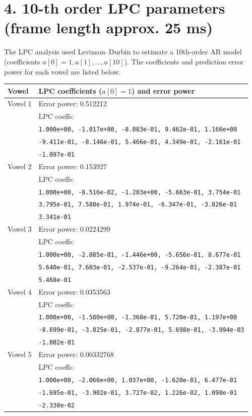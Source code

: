 \documentclass[11pt,a4paper]{article}
\begin{document}
\section*{4. 10-th order LPC parameters (frame length approx. 25 ms)}
The LPC analysis used Levinson--Durbin to estimate a 10th-order AR model (coefficients $a[0]=1, a[1],...,a[10]$). The coefficients and prediction error power for each vowel are listed below.
\usepackage{array}
\begin{longtable}{@{} l >{\raggedright\arraybackslash}p{10cm} @{} }
\textbf{Vowel} & \textbf{LPC coefficients ($a[0]=1$) and error power}\\ \hline
Vowel 1 & Error power: 0.512212\\& LPC coeffs:\\& \verb|1.000e+00, -1.017e+00, -8.083e-01, 9.462e-01, 1.166e+00| \\
& \verb|-9.411e-01, -8.146e-01, 5.466e-01, 4.349e-01, -2.161e-01| \\
& \verb|-1.097e-01|\\[4pt]
Vowel 2 & Error power: 0.153927\\& LPC coeffs:\\& \verb|1.000e+00, -8.516e-02, -1.203e+00, -5.663e-01, 3.754e-01| \\
& \verb|3.795e-01, 7.580e-01, 1.974e-01, -6.347e-01, -3.826e-01| \\
& \verb|3.341e-01|\\[4pt]
Vowel 3 & Error power: 0.0224299\\& LPC coeffs:\\& \verb|1.000e+00, -2.085e-01, -1.446e+00, -5.656e-01, 8.677e-01| \\
& \verb|5.640e-01, 7.603e-01, -2.537e-01, -9.264e-01, -2.387e-01| \\
& \verb|5.468e-01|\\[4pt]
Vowel 4 & Error power: 0.0353563\\& LPC coeffs:\\& \verb|1.000e+00, -1.580e+00, -1.368e-01, 5.720e-01, 1.197e+00| \\
& \verb|-8.699e-01, -3.025e-01, -2.877e-01, 5.698e-01, -3.994e-03| \\
& \verb|-1.002e-01|\\[4pt]
Vowel 5 & Error power: 0.00332768\\& LPC coeffs:\\& \verb|1.000e+00, -2.066e+00, 1.037e+00, -1.620e-01, 6.477e-01| \\
& \verb|-1.695e-01, -3.902e-01, 3.727e-02, 1.226e-02, 1.098e-01| \\
& \verb|-2.330e-02|\\[4pt]
\end{longtable}
\end{document}
